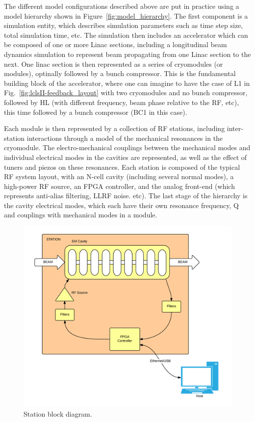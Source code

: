 \documentclass[a4paper,12pt]{article}
\begin{document}
The different model configurations described above are put in practice using a model hierarchy shown in Figure~\ref{fig:model_hierarchy}. The first component is a simulation entity, which describes simulation parameters such as time step size, total simulation time, etc. The simulation then includes an accelerator which can be composed of one or more Linac sections, including a longitudinal beam dynamics simulation to represent beam propagating from one Linac section to the next. One linac section is then represented as a series of cryomodules (or modules), optinally followed by a bunch compressor. This is the fundamental building block of the accelerator, where one can imagine to have the case of L1 in Fig.~\ref{fig:lclsII-feedback_layout} with two cryomodules and no bunch compressor, followed by HL (with different frequency, beam phase relative to the RF, etc), this time followed by a bunch compressor (BC1 in this case).

Each module is then represented by a collection of RF stations, including inter-station interactions through a model of the mechanical resonances in the cryomodule. The electro-mechanical couplings between the mechanical modes and individual electrical modes in the cavities are represented, as well as the effect of tuners and piezos on these resonances. Each station is composed of the typical RF system layout, with an N-cell cavity (including several normal modes), a high-power RF source, an FPGA controller, and the analog front-end (which represents anti-alias filtering, LLRF noise. etc). The last stage of the hierarchy is the cavity electrical modes, which each have their own resonance frequency, Q and couplings with mechanical modes in a module.

\begin{figure}
\centering
\includegraphics[scale=0.18]{../figures/Station_block_diagram.png}
\caption{Station block diagram.}
\label{fig:Station_block_diagram}
\end{figure}
\end{document}
